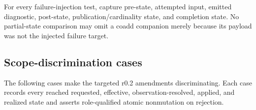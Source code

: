 \documentclass[10pt]{article}
\begin{document}
For every failure-injection test, capture pre-state, attempted input, emitted
diagnostic, post-state, publication/cardinality state, and completion state.
No partial-state comparison may omit a coadd companion merely because its
payload was not the injected failure target.

\subsection{Scope-discrimination cases}

The following cases make the targeted r0.2 amendments discriminating. Each
case records every reached requested, effective, observation-resolved, applied,
and realized state and asserts role-qualified atomic nonmutation on rejection.

\SCIMapProductRoleDefinition

\SCIMapProductRoleDependencyTable
\end{document}
